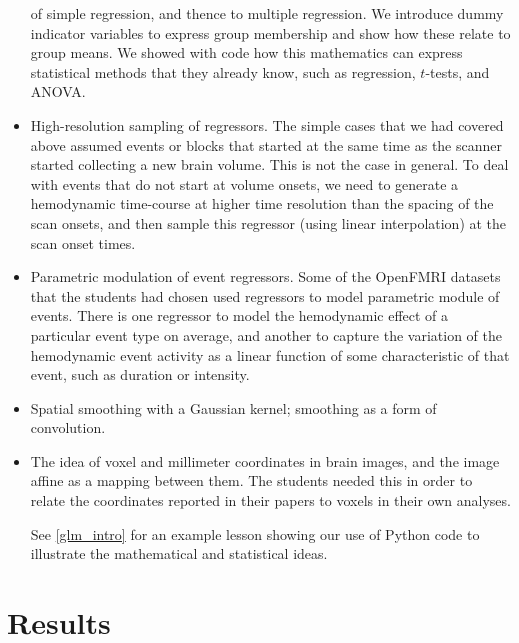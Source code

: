 \begin{itemize}
        of simple regression, and thence to multiple regression.  We introduce
        dummy indicator variables to express group membership and show how
        these relate to group means.  We showed with code how this mathematics
        can express statistical methods that they already know, such as
        regression, $t$-tests, and ANOVA.
\item
    High-resolution sampling of regressors.  The simple cases that we had
        covered above assumed events or blocks that started at the same time
        as the scanner started collecting a new brain volume.  This is not the
        case in general.  To deal with events that do not start at volume
        onsets, we need to generate a hemodynamic time-course at higher
        time resolution than the spacing of the scan onsets, and then sample
        this regressor (using linear interpolation) at the scan onset times.
\item
    Parametric modulation of event regressors.  Some of the OpenFMRI datasets
        that the students had chosen used regressors to model parametric
        module of events.  There is one regressor to model the hemodynamic
        effect of a particular event type on average, and another to capture
        the variation of the hemodynamic event activity as a linear function
        of some characteristic of that event, such as duration or intensity.
\item
    Spatial smoothing with a Gaussian kernel; smoothing as a form of
    convolution.

\item
    The idea of voxel and millimeter coordinates in brain images, and the
    image affine as a mapping between them.  The students needed this in order
    to relate the coordinates reported in their papers to voxels in their own
    analyses.

See \cref{glm_intro} for an example lesson showing our use of Python code to
illustrate the mathematical and statistical ideas.




\end{itemize}

\section{Results}\label{results}

